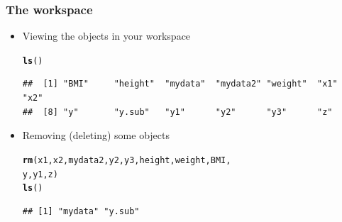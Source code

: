 \documentclass[color=usenames,dvipsnames]{beamer}\usepackage[]{graphicx}\usepackage[]{color}
\makeatletter
\newcommand{\hlstd}[1]{\textcolor[rgb]{0.345,0.345,0.345}{#1}}%
\newcommand{\hlkwd}[1]{\textcolor[rgb]{0.737,0.353,0.396}{\textbf{#1}}}%
\newenvironment{kframe}{%
 \def\at@end@of@kframe{}%
 \ifinner\ifhmode%
  \def\at@end@of@kframe{\end{minipage}}%
  \begin{minipage}{\columnwidth}%
 \fi\fi%
 \def\FrameCommand##1{\hskip\@totalleftmargin \hskip-\fboxsep
 \colorbox{shadecolor}{##1}\hskip-\fboxsep
     \hskip-\linewidth \hskip-\@totalleftmargin \hskip\columnwidth}%
 \MakeFramed {\advance\hsize-\width
   \@totalleftmargin\z@ \linewidth\hsize
   \@setminipage}}%
 {\par\unskip\endMakeFramed%
 \at@end@of@kframe}
\newenvironment{knitrout}{}{} %
\makeatother
\begin{document}
\begin{frame}[fragile]
  \frametitle{The workspace}
  \begin{itemize}[<+->]
    \item Viewing the objects in your workspace
\begin{knitrout}
\color{fgcolor}\begin{kframe}
\begin{alltt}
\hlkwd{ls}\hlstd{()}
\end{alltt}
\begin{verbatim}
##  [1] "BMI"     "height"  "mydata"  "mydata2" "weight"  "x1"      "x2"     
##  [8] "y"       "y.sub"   "y1"      "y2"      "y3"      "z"
\end{verbatim}
\end{kframe}
\end{knitrout}
    \item Removing (deleting) some objects
\begin{knitrout}
\color{fgcolor}\begin{kframe}
\begin{alltt}
\hlkwd{rm}\hlstd{(x1, x2, mydata2, y2, y3, height, weight, BMI,}
   \hlstd{y, y1, z)}
\hlkwd{ls}\hlstd{()}
\end{alltt}
\begin{verbatim}
## [1] "mydata" "y.sub"
\end{verbatim}
\end{kframe}
\end{knitrout}
  \end{itemize}
\end{frame}
\end{document}
